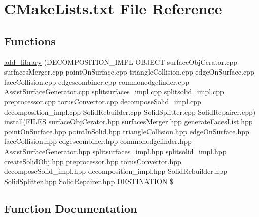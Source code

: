 \hypertarget{Implementation_2decomposition_2CMakeLists_8txt}{}\section{C\+Make\+Lists.\+txt File Reference}
\label{Implementation_2decomposition_2CMakeLists_8txt}
\subsection*{Functions}
\begin{DoxyCompactItemize}
\item 
\hyperlink{Implementation_2decomposition_2CMakeLists_8txt_abaf6c2ca51de653ee287193b7dbef810}{add\+\_\+library} (D\+E\+C\+O\+M\+P\+O\+S\+I\+T\+I\+O\+N\+\_\+\+I\+M\+PL O\+B\+J\+E\+CT surface\+Obj\+Cerator.\+cpp surfaces\+Merger.\+cpp point\+On\+Surface.\+cpp triangle\+Collision.\+cpp edge\+On\+Surface.\+cpp face\+Collision.\+cpp edgescombiner.\+cpp commonedgefinder.\+cpp Assist\+Surface\+Generator.\+cpp splitsurfaces\+\_\+impl.\+cpp splitsolid\+\_\+impl.\+cpp preprocessor.\+cpp torus\+Convertor.\+cpp decompose\+Solid\+\_\+impl.\+cpp decomposition\+\_\+impl.\+cpp Solid\+Rebuilder.\+cpp Solid\+Splitter.\+cpp Solid\+Repairer.\+cpp) install(F\+I\+L\+ES surface\+Obj\+Cerator.\+hpp surfaces\+Merger.\+hpp generate\+Faces\+List.\+hpp point\+On\+Surface.\+hpp point\+In\+Solid.\+hpp triangle\+Collision.\+hpp edge\+On\+Surface.\+hpp face\+Collision.\+hpp edgescombiner.\+hpp commonedgefinder.\+hpp Assist\+Surface\+Generator.\+hpp splitsurfaces\+\_\+impl.\+hpp splitsolid\+\_\+impl.\+hpp create\+Solid\+Obj.\+hpp preprocessor.\+hpp torus\+Convertor.\+hpp decompose\+Solid\+\_\+impl.\+hpp decomposition\+\_\+impl.\+hpp Solid\+Rebuilder.\+hpp Solid\+Splitter.\+hpp Solid\+Repairer.\+hpp D\+E\+S\+T\+I\+N\+A\+T\+I\+ON \$
\end{DoxyCompactItemize}


\subsection{Function Documentation}
\mbox{\label{Implementation_2decomposition_2CMakeLists_8txt_abaf6c2ca51de653ee287193b7dbef810}} 
